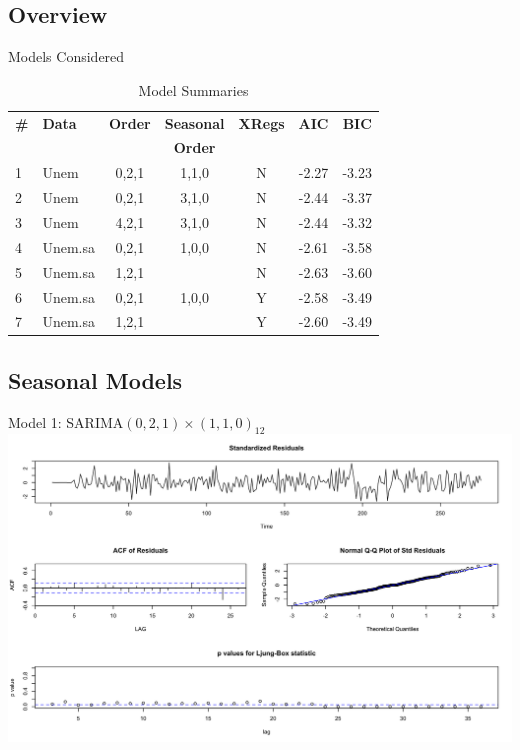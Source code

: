 {     \subsection{Overview}
     \begin{frame}{Models Considered}
     	\begin{table}[H]
     		\centering
     		\caption{Model Summaries}
     		\begin{tabular}{llccccc}
     			\hline
     			\textbf{\#}& \textbf{Data}  & \textbf{Order} & \textbf{Seasonal} & \textbf{XRegs} & \textbf{AIC} & \textbf{BIC} \\
     			&&&\textbf{Order}&&&\\ 
     			\hline
     			1 & Unem  & 0,2,1 & 1,1,0 & N & -2.27 & -3.23 \\ 
     			2 & Unem  & 0,2,1 & 3,1,0 & N & -2.44 & -3.37 \\ 
     			3 & Unem  & 4,2,1 & 3,1,0 & N & -2.44 & -3.32 \\ 
     			4 & Unem.sa & 0,2,1 & 1,0,0 & N & -2.61 & -3.58 \\ 
     			5 & Unem.sa  & 1,2,1 &  & N & -2.63 & -3.60 \\ 
     			6 & Unem.sa & 0,2,1 & 1,0,0 & Y & -2.58 & -3.49 \\ 
     			7 & Unem.sa  & 1,2,1 &  & Y & -2.60 & -3.49 \\ 
     			\hline
     		\end{tabular}
     		\label{tab:models}
     	\end{table}
     \end{frame}
     
     \subsection{Seasonal Models}
     \begin{frame}{Model 1: SARIMA\((0,2,1) \times (1,1,0)_{12}\)}
     	\includegraphics[width=\linewidth]{images/seasonalmodel1}
     \end{frame}
     
}
